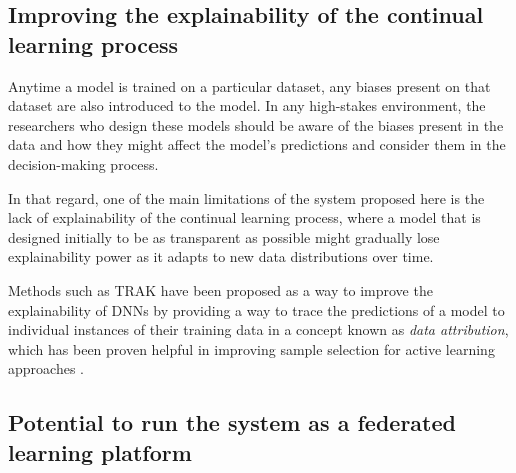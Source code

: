 \documentclass[../main.tex]{subfiles}
\begin{document}
    \subsection{
        Improving the explainability of the continual learning process 
    }   \label{conclusions:future_work:explainability}
    
    Anytime a model is trained on a particular dataset, any biases present on that dataset are also introduced to the model. In any high-stakes environment, the researchers who design these models should be aware of the biases present in the data and how they might affect the model's predictions and consider them in the decision-making process.

    
    
    In that regard, one of the main limitations of the system proposed here is the lack of explainability of the continual learning process, where a model that is designed initially to be as transparent as possible might gradually lose explainability power as it adapts to new data distributions over time.
    
    Methods such as TRAK \cite{park_trak_2023} have been proposed as a way to improve the explainability of DNNs by providing a way to trace the predictions of a model to individual instances of their training data in a concept known as \textit{data attribution}, which has been proven helpful in improving sample selection for active learning approaches \cite{park_trak_2023, holzmuller_framework_2023, liu_influence_2021}.

    \subsection{Potential to run the system as a federated learning platform} \label{conclusions:future_work:federated} 
\end{document}
